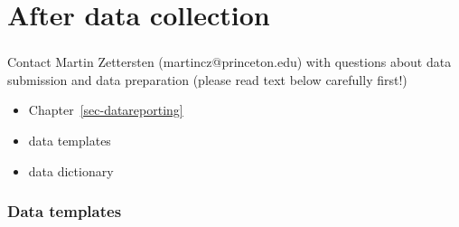 \documentclass[
  letterpaper,
  DIV=11,
  numbers=noendperiod,
  oneside]{scrreprt}
\providecommand{\tightlist}{%
  \setlength{\itemsep}{0pt}\setlength{\parskip}{0pt}}
\begin{document}
\part{After data collection}

\section*{}\label{section}

\markright{}

Contact Martin Zettersten (martincz@princeton.edu) with questions about
data submission and data preparation (please read text below carefully
first!)

\begin{itemize}
\tightlist
\item
  Chapter~\ref{sec-datareporting}
\item
  data templates
\item
  data dictionary
\end{itemize}

\section*{Data templates}\label{data-templates}

\end{document}
